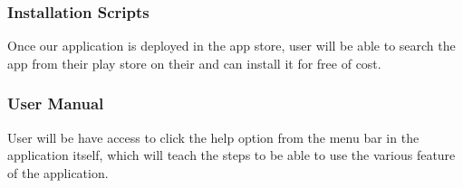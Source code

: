 \subsubsection{Installation Scripts}
Once our application is deployed in the app store, user will be able to search the app from their play store on their and can install it for free of cost.

\subsubsection{User Manual}
User will be have access to click the help option from the menu bar in the application itself, which will teach the steps to be able to use the various feature of the application.
